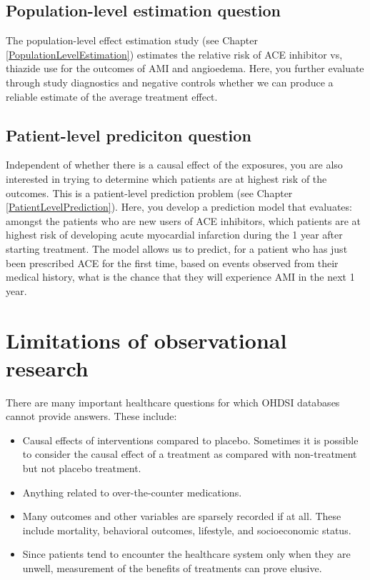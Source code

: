 \documentclass[11pt]{book}
\providecommand{\tightlist}{%
  \setlength{\itemsep}{0pt}\setlength{\parskip}{0pt}}
\theoremstyle{definition}
\theoremstyle{definition}
\theoremstyle{definition}
\theoremstyle{remark}
\begin{document}
\hypertarget{population-level-estimation-question}{%
\subsection{Population-level estimation question}\label{population-level-estimation-question}}

The population-level effect estimation study (see Chapter \ref{PopulationLevelEstimation}) estimates the relative risk of ACE inhibitor vs, thiazide use for the outcomes of AMI and angioedema. Here, you further evaluate through study diagnostics and negative controls whether we can produce a reliable estimate of the average treatment effect.

\hypertarget{patient-level-prediciton-question}{%
\subsection{Patient-level prediciton question}\label{patient-level-prediciton-question}}

Independent of whether there is a causal effect of the exposures, you are also interested in trying to determine which patients are at highest risk of the outcomes. This is a patient-level prediction problem (see Chapter \ref{PatientLevelPrediction}). Here, you develop a prediction model that evaluates: amongst the patients who are new users of ACE inhibitors, which patients are at highest risk of developing acute myocardial infarction during the 1 year after starting treatment. The model allows us to predict, for a patient who has just been prescribed ACE for the first time, based on events observed from their medical history, what is the chance that they will experience AMI in the next 1 year.

\hypertarget{limitations-of-observational-research}{%
\section{Limitations of observational research}\label{limitations-of-observational-research}}

There are many important healthcare questions for which OHDSI databases cannot provide answers. These include:

\begin{itemize}
\tightlist
\item
  Causal effects of interventions compared to placebo. Sometimes it is possible to consider the causal effect of a treatment as compared with non-treatment but not placebo treatment.
\item
  Anything related to over-the-counter medications.
\item
  Many outcomes and other variables are sparsely recorded if at all. These include mortality, behavioral outcomes, lifestyle, and socioeconomic status.
\item
  Since patients tend to encounter the healthcare system only when they are unwell, measurement of the benefits of treatments can prove elusive.
\end{itemize}
\end{document}
